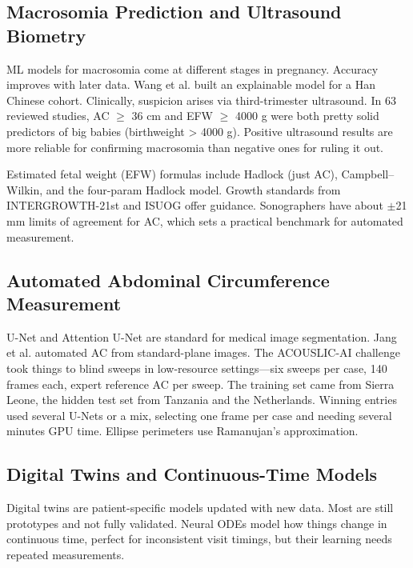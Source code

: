 \documentclass[conference]{IEEEtran}
\begin{document}
\subsection{Macrosomia Prediction and Ultrasound Biometry}

ML models for macrosomia come at different stages in pregnancy. Accuracy improves with later data. Wang et al. built an explainable model for a Han Chinese cohort. Clinically, suspicion arises via third-trimester ultrasound. In 63 reviewed studies, AC \ensuremath{\geq} 36 cm and EFW \ensuremath{\geq} 4000 g were both pretty solid predictors of big babies (birthweight > 4000 g). Positive ultrasound results are more reliable for confirming macrosomia than negative ones for ruling it out.



Estimated fetal weight (EFW) formulas include Hadlock (just AC), Campbell--Wilkin, and the four-param Hadlock model. Growth standards from INTERGROWTH-21st and ISUOG offer guidance. Sonographers have about \ensuremath{\pm}21 mm limits of agreement for AC, which sets a practical benchmark for automated measurement.



\subsection{Automated Abdominal Circumference Measurement}

U-Net and Attention U-Net are standard for medical image segmentation. Jang et al. automated AC from standard-plane images. The ACOUSLIC-AI challenge took things to blind sweeps in low-resource settings---six sweeps per case, 140 frames each, expert reference AC per sweep. The training set came from Sierra Leone, the hidden test set from Tanzania and the Netherlands. Winning entries used several U-Nets or a mix, selecting one frame per case and needing several minutes GPU time. Ellipse perimeters use Ramanujan's approximation.



\subsection{Digital Twins and Continuous-Time Models}

Digital twins are patient-specific models updated with new data. Most are still prototypes and not fully validated. Neural ODEs model how things change in continuous time, perfect for inconsistent visit timings, but their learning needs repeated measurements.
\end{document}
